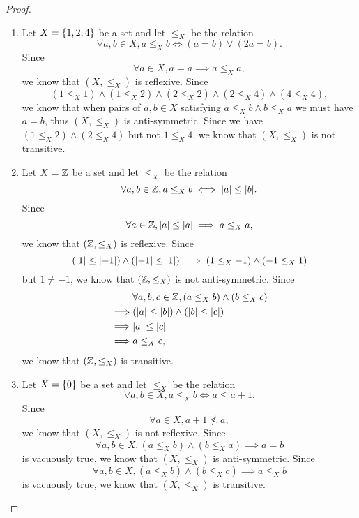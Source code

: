 \begin{proof}
  \begin{enumerate}
    \item Let \(X = \left\lbrace1, 2, 4\right\rbrace\) be a set and let \(\leq_X\) be the relation
          \[
            \forall a, b \in X, a \leq_X b \iff (a = b) \lor (2a = b).
          \]
          Since
          \[
            \forall a \in X, a = a \implies a \leq_X a,
          \]
          we know that \((X, \leq_X)\) is reflexive.
          Since
          \[
            (1 \leq_X 1) \land (1 \leq_X 2) \land (2 \leq_X 2) \land (2 \leq_X 4) \land (4 \leq_X 4),
          \]
          we know that when pairs of \(a, b \in X\) satisfying \(a \leq_X b \land b \leq_X a\) we must have \(a = b\), thus \((X, \leq_X)\) is anti-symmetric.
          Since we have \((1 \leq_X 2) \land (2 \leq_X 4)\) but not \(1 \leq_X 4\), we know that \((X, \leq_X)\) is not transitive.
    \item Let \(X = \mathbb{Z}\) be a set and let \(\leq_X\) be the relation
          \[
            \forall a, b \in \Z, a \leq_X b \iff \abs{a} \leq \abs{b}.
          \]
          Since
          \[
            \forall a \in \mathbb{Z}, \left\lvert a\right\rvert \leq \left\lvert a\right\rvert \implies a \leq_X a,
          \]
          we know that \((\mathbb{Z}, \leq_X)\) is reflexive.
          Since
          \[
            (\left\lvert1\right\rvert \leq \left\lvert-1\right\rvert) \land (\left\lvert-1\right\rvert \leq \left\lvert1\right\rvert) \implies (1 \leq_X -1) \land (-1 \leq_X 1)
          \]
          but \(1 \neq -1\), we know that \((\mathbb{Z}, \leq_X)\) is not anti-symmetric.
          Since
          \begin{align*}
                     & \forall a, b, c \in \Z, (a \leq_X b) \land (b \leq_X c) \\
            \implies & (\abs{a} \leq \abs{b}) \land (\abs{b} \leq \abs{c})     \\
            \implies & \abs{a} \leq \abs{c}                                    \\
            \implies & a \leq_X c,
          \end{align*}
          we know that \((\mathbb{Z}, \leq_X)\) is transitive.
    \item Let \(X = \left\lbrace0\right\rbrace\) be a set and let \(\leq_X\) be the relation
          \[
            \forall a, b \in X, a \leq_X b \iff a \leq a + 1.
          \]
          Since
          \[
            \forall a \in X, a + 1 \not\leq a,
          \]
          we know that \((X, \leq_X)\) is not reflexive.
          Since
          \[
            \forall a, b \in X, (a \leq_X b) \land (b \leq_X a) \implies a = b
          \]
          is vacuously true, we know that \((X, \leq_X)\) is anti-symmetric.
          Since
          \[
            \forall a, b \in X, (a \leq_X b) \land (b \leq_X c) \implies a \leq_X b
          \]
          is vacuously true, we know that \((X, \leq_X)\) is transitive.
  \end{enumerate}
\end{proof}

